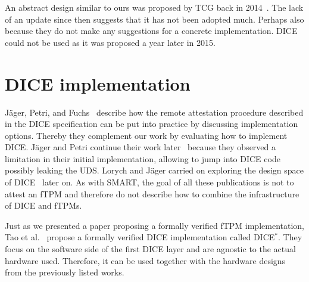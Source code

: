 An abstract design similar to ours was proposed by \ac{TCG} back in 2014~\cite{tcgTpmMobile}.
The lack of an update since then suggests that it has not been adopted much. 
Perhaps also because they do not make any suggestions for a concrete implementation.
DICE could not be used as it was proposed a year later in 2015.

\section{DICE implementation}

Jäger, Petri, and Fuchs~\cite{Jaeger2017} describe how the remote attestation procedure described in the DICE specification can be put into practice by discussing implementation options.
Thereby they complement our work by evaluating how to implement \ac{DICE}\@.
Jäger and Petri continue their work later~\cite{Jaeger2020} because they observed a limitation in their initial implementation, allowing to jump into \ac{DICE} code possibly leaking the \ac{UDS}.
Lorych and Jäger carried on exploring the design space of DICE~\cite{Lorych2022} later on.
As with SMART, the goal of all these publications is not to attest an \ac{fTPM} and therefore do not describe how to combine the infrastructure of DICE and \acp{fTPM}.

Just as we presented a paper proposing a formally verified \ac{fTPM} implementation, Tao et al.~\cite{272306} propose a formally verified \ac{DICE} implementation called DICE\( ^* \).
They focus on the software side of the first DICE layer and are agnostic to the actual hardware used.
Therefore, it can be used together with the hardware designs from the previously listed works.









